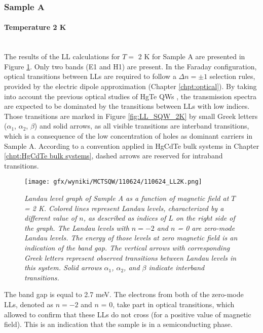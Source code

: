 \documentclass[titlepage,a4paper]{book}
\newcommand{\wciecie}{\quad\phantom{v}}
\newcommand{\myparagraph}[1]{\paragraph{#1}\mbox{}\\}
\begin{document}
\subsubsection{Sample A}
\myparagraph{Temperature 2 K}
\wciecie
The results of the LL calculations for $T =$ 2 K for Sample A are presented in Figure \ref{fig:LL_110624_2K}. Only two bands (E1 and H1) are present. In the Faraday configuration, optical transitions between LLs are required to follow a $\Delta n = \pm 1$ selection rules, provided by the electric dipole approximation (Chapter \ref{chpt:optical}). By taking into account the previous optical studies of HgTe QWs \cite{Schultz}\cite{Orlita_MCT_QW}\cite{Zholudev_MCT_QW}\cite{Ikonnikov_MCT_SQW}\cite{Ludwig_MCT_QW}\cite{Zholudev_MCT_QW_anticrossing}, the transmission spectra are expected to be dominated by the transitions between LLs with low indices. Those transitions are marked in Figure \ref{fig:LL_SQW_2K} by small Greek letters ($\alpha_1$, $\alpha_2$, $\beta$) and solid arrows, as all visible transitions are interband transitions, which is a consequence of the low concentration of holes as dominant carriers in Sample A. According to a convention applied in HgCdTe bulk systems in Chapter \ref{chpt:HgCdTe bulk systems}, dashed arrows are reserved for intraband transitions. 

\begin{figure}[ht]
	\centering
	\texttt{[image: gfx/wyniki/MCTSQW/110624/110624\_LL2K.png]}
	\vspace{-10pt}
	\caption{\textit{Landau level graph of Sample A as a function of magnetic field at $T$ = 2 K. Colored lines represent Landau levels, characterized by a different value of $n$, as described as indices of $L$ on the right side of the graph. The Landau levels with $n = -2$ and $n$ = 0 are zero-mode Landau levels. The energy of those levels at zero magnetic field is an indication of the band gap. The vertical arrows with corresponding Greek letters represent observed transitions between Landau levels in this system. Solid arrows $\alpha_1$, $\alpha_2$, and $\beta$ indicate interband transitions.}}
	\label{fig:LL_110624_2K}
\end{figure}

The band gap is equal to 2.7 meV. The electrons from both of the zero-mode LLs, denoted as $n = -2$ and $n$ = 0, take part in optical transitions, which allowed to confirm that these LLs do not cross (for a positive value of magnetic field). This is an indication that the sample is in a semiconducting phase. 
\end{document}
